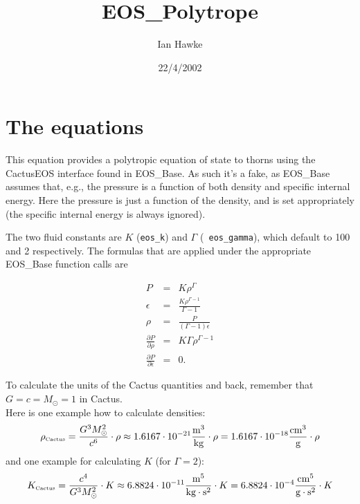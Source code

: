 \documentclass{article}
\begin{document}
\title{EOS\_Polytrope}
\author{Ian Hawke}
\date{22/4/2002}
\maketitle



\section{The equations}
\label{sec:eqn}

This equation provides a polytropic equation of state to thorns using
the CactusEOS interface found in EOS\_Base. As such it's a fake, as
EOS\_Base assumes that, e.g., the pressure is a function of both
density and specific internal energy. Here the pressure is just a
function of the density, and is set appropriately (the specific
internal energy is always ignored).

The two fluid constants are $K$ ({\tt eos\_k}) and $\Gamma$ ({\tt
  eos\_gamma}), which default to 100 and 2 respectively. The formulas
that are applied under the appropriate EOS\_Base function calls are

\begin{eqnarray}
  \label{eq:eosformulas}
  P & = & K \rho^{\Gamma} \\
  \epsilon & = & \frac{K \rho^{\Gamma-1}}{\Gamma - 1} \\
  \rho & = & \frac{P}{(\Gamma - 1) \epsilon} \\
  \frac{\partial P}{\partial \rho} & = & K \Gamma \rho^{\Gamma-1} \\
  \frac{\partial P}{\partial \epsilon} & = & 0.
\end{eqnarray}

To calculate the units of the Cactus quantities and back, remember that
$G=c=M_{\odot}=1$ in Cactus.\\
Here is one example how to calculate densities:
\begin{equation}
 \rho_{\mbox{\tiny Cactus}}=\frac{G^3M_{\odot}^2}{c^6}\cdot \rho
 \approx1.6167\cdot10^{-21}\frac{\mbox{m}^3}{\mbox{kg}}\cdot\rho=
        1.6167\cdot10^{-18}\frac{\mbox{cm}^3}{\mbox{g}}\cdot\rho
\end{equation}
and one example for calculating $K$ (for $\Gamma=2$):
\begin{equation}
 K_{\mbox{\tiny Cactus}}=\frac{c^4}{G^3M_{\odot}^2}\cdot K
 \approx6.8824\cdot10^{-11}\frac{\mbox{m}^5}{\mbox{kg}\cdot\mbox{s}^2}\cdot K=
        6.8824\cdot10^{-4}\frac{\mbox{cm}^5}{\mbox{g}\cdot\mbox{s}^2}\cdot K
\end{equation}
\end{document}
